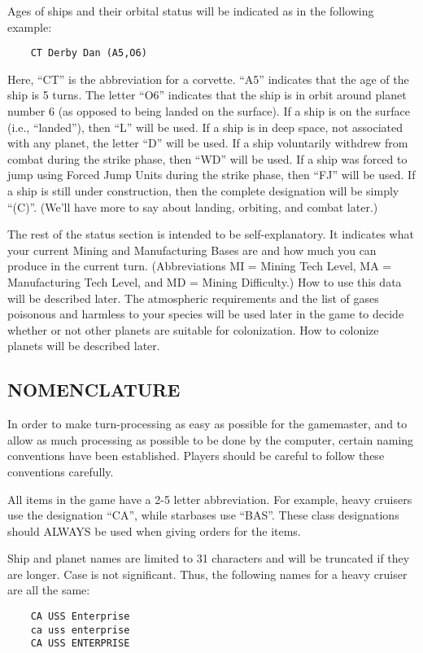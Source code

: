 \documentclass[10pt,titlepage]{article}
\begin{document}
Ages of ships and their orbital status will be indicated as in the following
example:
\begin{verbatim}
	CT Derby Dan (A5,O6)
\end{verbatim}
Here, ``CT'' is the abbreviation for a corvette.  ``A5'' indicates that the age
of the ship is 5 turns.  The letter ``O6'' indicates that the ship is in orbit
around planet number 6 (as opposed to being landed on the surface).  If a ship
is on the surface (i.e., ``landed''), then ``L'' will be used.  If a ship is in
deep space, not associated with any planet, the letter ``D'' will be used.  If a
ship voluntarily withdrew from combat during the strike phase, then ``WD'' will
be used.  If a ship was forced to jump using Forced Jump Units during the
strike phase, then ``FJ'' will be used.  If a ship is still under construction,
then the complete designation will be simply ``(C)''.  (We'll have more to say
about landing, orbiting, and combat later.)

The rest of the status section is intended to be self-explanatory.  It
indicates what your current Mining and Manufacturing Bases are and how much
you can produce in the current turn.  (Abbreviations MI = Mining Tech Level,
MA = Manufacturing Tech Level, and MD = Mining Difficulty.)  How to use this
data will be described later.  The atmospheric requirements and the list of
gases poisonous and harmless to your species will be used later in the game
to decide whether or not other planets are suitable for colonization.  How
to colonize planets will be described later.


\subsection{NOMENCLATURE}
\label{sec:nomenclature}


In order to make turn-processing as easy as possible for the gamemaster, and to
allow as much processing as possible to be done by the computer, certain naming
conventions have been established.  Players should be careful to follow these
conventions carefully.

All items in the game have a 2-5 letter abbreviation.  For example, heavy
cruisers use the designation ``CA'', while starbases use ``BAS''.  These class
designations should ALWAYS be used when giving orders for the items.

Ship and planet names are limited to 31 characters and will be truncated if
they are longer.  Case is not significant.  Thus, the following names for a
heavy cruiser are all the same:
\begin{verbatim}
	CA USS Enterprise
	ca uss enterprise
	CA USS ENTERPRISE
\end{verbatim}
\end{document}

